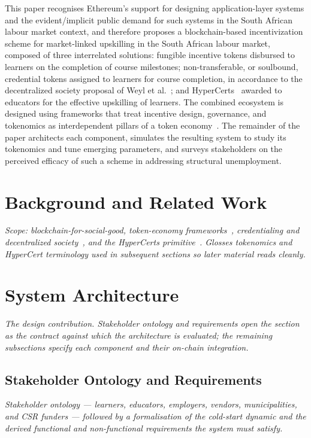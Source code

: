 \documentclass[conference]{IEEEtran}
\begin{document}
This paper recognises Ethereum's support for designing application-layer systems and the evident/implicit public demand for such systems in the South African labour market context, and therefore proposes a blockchain-based incentivization scheme for market-linked upskilling in the South African labour market, composed of three interrelated solutions: fungible incentive tokens disbursed to learners on the completion of course milestones; non-transferable, or soulbound, credential tokens assigned to learners for course completion, in accordance to the decentralized society proposal of Weyl et al.~\cite{weyl2022decentralized}; and HyperCerts~\cite{dalrymple2022hypercerts} awarded to educators for the effective upskilling of learners. The combined ecosystem is designed using frameworks that treat incentive design, governance, and tokenomics as interdependent pillars of a token economy~\cite{oliveira2018token,kivilo2026designing,sadykhov2023detect}. The remainder of the paper architects each component, simulates the resulting system to study its tokenomics and tune emerging parameters, and surveys stakeholders on the perceived efficacy of such a scheme in addressing structural unemployment.

\section{Background and Related Work}
\textit{Scope: blockchain-for-social-good, token-economy frameworks~\cite{oliveira2018token,kivilo2026designing,sadykhov2023detect}, credentialing and decentralized society~\cite{weyl2022decentralized}, and the HyperCerts primitive~\cite{dalrymple2022hypercerts}. Glosses tokenomics and HyperCert terminology used in subsequent sections so later material reads cleanly.}

\section{System Architecture}
\textit{The design contribution. Stakeholder ontology and requirements open the section as the contract against which the architecture is evaluated; the remaining subsections specify each component and their on-chain integration.}

\subsection{Stakeholder Ontology and Requirements}
\textit{Stakeholder ontology --- learners, educators, employers, vendors, municipalities, and CSR funders --- followed by a formalisation of the cold-start dynamic and the derived functional and non-functional requirements the system must satisfy.}
\end{document}
